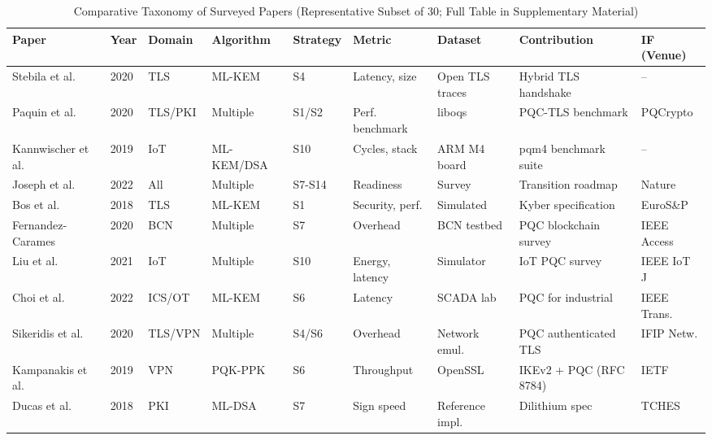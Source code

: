 \documentclass[journal]{IEEEtran}
\begin{document}
\begin{table}[!t]
\caption{Comparative Taxonomy of Surveyed Papers (Representative Subset of 30; Full Table in Supplementary Material)}
\label{tab:taxonomy_comparative}
\centering
\scriptsize
\renewcommand{\arraystretch}{1.1}
\begin{tabular}{@{}L{2.5cm}C{1.0cm}C{1.3cm}C{1.3cm}C{1.3cm}C{1.3cm}C{1.2cm}C{2.0cm}C{1.5cm}@{}}
\toprule
\textbf{Paper} & \textbf{Year} & \textbf{Domain} & \textbf{Algorithm} & \textbf{Strategy} & \textbf{Metric} & \textbf{Dataset} & \textbf{Contribution} & \textbf{IF (Venue)} \\
\midrule
Stebila et al.~\cite{stebila2020postquantum}      & 2020 & TLS     & ML-KEM    & S4 & Latency, size & Open TLS traces & Hybrid TLS handshake & -- \\
Paquin et al.~\cite{paquin2020benchmarking}       & 2020 & TLS/PKI & Multiple  & S1/S2 & Perf. benchmark & liboqs & PQC-TLS benchmark & PQCrypto \\
Kannwischer et al.~\cite{kannwischer2019pqm4}     & 2019 & IoT     & ML-KEM/DSA & S10 & Cycles, stack & ARM M4 board & pqm4 benchmark suite & -- \\
Joseph et al.~\cite{joseph2022transitioning}      & 2022 & All     & Multiple  & S7-S14 & Readiness & Survey & Transition roadmap & Nature \\
Bos et al.~\cite{bos2018crystals}                 & 2018 & TLS     & ML-KEM    & S1 & Security, perf. & Simulated & Kyber specification & EuroS\&P \\
Fernandez-Carames~\cite{fernandezcarames2020review} & 2020 & BCN   & Multiple  & S7 & Overhead & BCN testbed & PQC blockchain survey & IEEE Access \\
Liu et al.~\cite{liu2021pqc}                      & 2021 & IoT     & Multiple  & S10 & Energy, latency & Simulator & IoT PQC survey & IEEE IoT J \\
Choi et al.~\cite{choi2022pqc}                    & 2022 & ICS/OT  & ML-KEM    & S6 & Latency & SCADA lab & PQC for industrial & IEEE Trans. \\
Sikeridis et al.~\cite{sikeridis2020pqc}          & 2020 & TLS/VPN & Multiple  & S4/S6 & Overhead & Network emul. & PQC authenticated TLS & IFIP Netw. \\
Kampanakis et al.~\cite{rfc8784}       & 2019 & VPN     & PQK-PPK  & S6 & Throughput & OpenSSL & IKEv2 + PQC (RFC 8784) & IETF \\
Ducas et al.~\cite{ducas2018crystals}             & 2018 & PKI     & ML-DSA    & S7 & Sign speed & Reference impl. & Dilithium spec & TCHES \\

\end{tabular}
\end{table}
\end{document}
